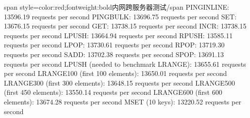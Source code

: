\documentclass[a4paper,10pt,english]{sphinxmanual}
\begin{document}
\begin{itemize}
\begin{itemize}
\begin{sphinxVerbatim}[commandchars=\\\{\}]
\PYGZlt{}span style=\PYGZsq{}color:red;font\PYGZhy{}weight:bold\PYGZsq{}\PYGZgt{}内网跨服务器测试\PYGZlt{}/span\PYGZgt{}
PING\PYGZus{}INLINE: 13596.19 requests per second
PING\PYGZus{}BULK: 13696.75 requests per second
SET: 13676.15 requests per second
GET: 13738.15 requests per second
INCR: 13738.15 requests per second
LPUSH: 13664.94 requests per second
RPUSH: 13585.11 requests per second
LPOP: 13730.61 requests per second
RPOP: 13719.30 requests per second
SADD: 13702.38 requests per second
SPOP: 13691.13 requests per second
LPUSH (needed to benchmark LRANGE): 13655.61 requests per second
LRANGE\PYGZus{}100 (first 100 elements): 13650.01 requests per second
LRANGE\PYGZus{}300 (first 300 elements): 13648.15 requests per second
LRANGE\PYGZus{}500 (first 450 elements): 13550.14 requests per second
LRANGE\PYGZus{}600 (first 600 elements): 13674.28 requests per second
MSET (10 keys): 13220.52 requests per second
\end{sphinxVerbatim}

\end{itemize}

\end{itemize}
\end{document}

